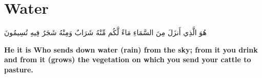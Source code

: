 \chapter{Water}
\begin{center}
    {\Huge    
        \begin{Arabic}
            هُوَ الَّذِي أَنزَلَ مِنَ السَّمَاءِ مَاءً لَّكُم مِّنْهُ شَرَابٌ وَمِنْهُ شَجَرٌ فِيهِ تُسِيمُونَ
        \end{Arabic}
    }    
\end{center}
\vspace*{\fill}
\vspace{3cm}
\begin{center}
    \Large \textbf{He it is Who sends down water (rain) from the sky; from it you drink and from it (grows) the vegetation on which you send your cattle to pasture.}
\end{center}
